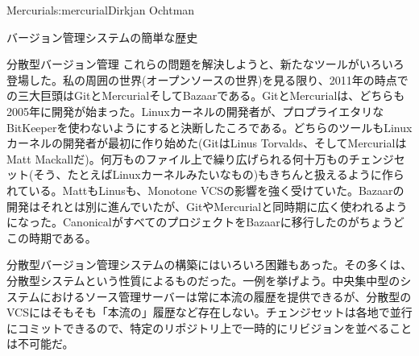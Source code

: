 \begin{aosachapter}{Mercurial}{s:mercurial}{Dirkjan Ochtman}
\begin{aosasect1}{バージョン管理システムの簡単な歴史}
\begin{aosasect2}{分散型バージョン管理}
これらの問題を解決しようと、新たなツールがいろいろ登場した。私の周囲の世界(オープンソースの世界)を見る限り、2011年の時点での三大巨頭はGitとMercurialそしてBazaarである。GitとMercurialは、どちらも2005年に開発が始まった。Linuxカーネルの開発者が、プロプライエタリなBitKeeperを使わないようにすると決断したころである。どちらのツールもLinuxカーネルの開発者が最初に作り始めた(GitはLinus Torvalds、そしてMercurialはMatt Mackallだ)。何万ものファイル上で繰り広げられる何十万ものチェンジセット(そう、たとえばLinuxカーネルみたいなもの)もきちんと扱えるように作られている。MattもLinusも、Monotone VCSの影響を強く受けていた。Bazaarの開発はそれとは別に進んでいたが、GitやMercurialと同時期に広く使われるようになった。CanonicalがすべてのプロジェクトをBazaarに移行したのがちょうどこの時期である。

分散型バージョン管理システムの構築にはいろいろ困難もあった。その多くは、分散型システムという性質によるものだった。一例を挙げよう。中央集中型のシステムにおけるソース管理サーバーは常に本流の履歴を提供できるが、分散型のVCSにはそもそも「本流の」履歴など存在しない。チェンジセットは各地で並行にコミットできるので、特定のリポジトリ上で一時的にリビジョンを並べることは不可能だ。


\end{aosasect2}
\end{aosasect1}
\end{aosachapter}
